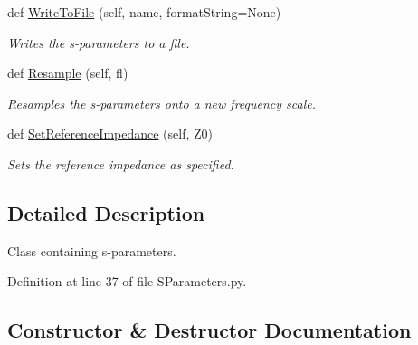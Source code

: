 \begin{DoxyCompactItemize}
def \hyperlink{classSignalIntegrity_1_1SParameters_1_1SParameters_1_1SParameters_add396ed0a719fa2c93037bc8486d2ff1}{Write\+To\+File} (self, name, format\+String=None)
\begin{DoxyCompactList}\small\item\em Writes the s-\/parameters to a file. \end{DoxyCompactList}\item 
def \hyperlink{classSignalIntegrity_1_1SParameters_1_1SParameters_1_1SParameters_a115ed63524d00ebadce833c2106fc7e9}{Resample} (self, fl)
\begin{DoxyCompactList}\small\item\em Resamples the s-\/parameters onto a new frequency scale. \end{DoxyCompactList}\item 
def \hyperlink{classSignalIntegrity_1_1SParameters_1_1SParameters_1_1SParameters_a98bb8cca60faa48d8aa1b2b667c36037}{Set\+Reference\+Impedance} (self, Z0)
\begin{DoxyCompactList}\small\item\em Sets the reference impedance as specified. \end{DoxyCompactList}\end{DoxyCompactItemize}


\subsection{Detailed Description}
Class containing s-\/parameters. 

Definition at line 37 of file S\+Parameters.\+py.



\subsection{Constructor \& Destructor Documentation}
\mbox{\label{classSignalIntegrity_1_1SParameters_1_1SParameters_1_1SParameters_a2590c40d1c3d840ed297c8f1ddcc74a4}} 
